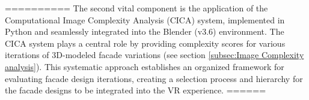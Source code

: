 %    
==========
The second vital component is the application of the Computational Image Complexity Analysis (CICA) system, implemented in Python and seamlessly integrated into the Blender (v3.6) environment.
The CICA system plays a central role by providing complexity scores for various iterations of 3D-modeled facade variations (see section \ref{subsec:Image Complexity analysis}).
This systematic approach establishes an organized framework for evaluating facade design iterations, creating a selection process and hierarchy for the facade designs to be integrated into the VR experience.
======